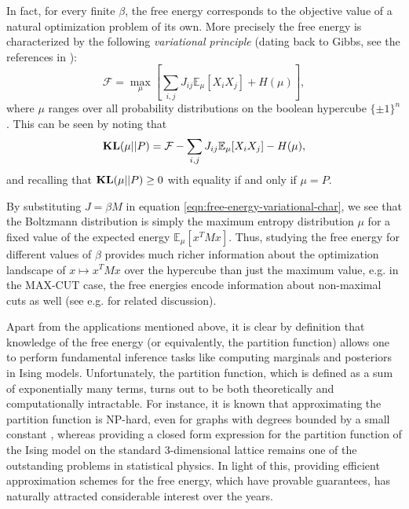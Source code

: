 \documentclass[final, 12pt]{colt2018}
\newcommand{\bE}{\mathbb{E}}
\newcommand{\F}{\mathcal{F}}
\newcommand{\E}{\bE}      %
\newcommand{\KL}{\mathop{\bf KL\/}}
\theoremstyle{definition}
\theoremstyle{plain}
\begin{document}
In fact, for every finite $\beta$, the free energy corresponds
to the objective value of a natural optimization problem of its own.
More precisely the free energy is characterized by the following \emph{variational principle} (dating back to Gibbs, see the references in \citet{ellis2007entropy}):
\begin{equation}
\label{eqn:free-energy-variational-char}
\F = \max_{\mu} \left[\sum_{i,j} J_{ij} \E_{\mu}[X_i X_j] + H(\mu)\right],
\end{equation}
where $\mu$ ranges over all probability distributions on the boolean hypercube $\{\pm 1\}^{n}$. This can be seen by noting that 
\begin{equation}
\label{eqn:free-energy-KL}
\KL(\mu ||P)=\F - \sum_{i,j} J_{ij} \E_{\mu}[X_i X_j] - H(\mu),
\end{equation}
and recalling that $\KL(\mu ||P) \geq 0$ with equality if and only if $\mu = P$.
 
By substituting $J = \beta M$ in equation \cref{eqn:free-energy-variational-char}, we  see %
that the Boltzmann distribution is simply the maximum entropy distribution $\mu$ for a fixed value
of the expected energy $\E_{\mu}[x^T M x]$. Thus, studying the free
energy for different values of $\beta$ provides much richer information about
the optimization landscape of $x \mapsto x^T M x$ over the hypercube than just the maximum value, e.g. in the MAX-CUT case, the free energies encode
information about non-maximal cuts as well (see e.g. \citet{borgs2012convergent} for related discussion).


Apart from the applications mentioned above, it is clear by definition that knowledge of the free energy (or equivalently, the partition function) allows one to perform fundamental inference tasks like computing marginals and posteriors in Ising models. Unfortunately, the partition function, which is defined as a sum of exponentially many terms, turns out to be both theoretically and computationally intractable. For instance, it is known that approximating the partition function is NP-hard, even for graphs with degrees bounded by a small constant \citep{sly-sun}, whereas providing a closed form expression for the partition function of the Ising model on the standard $3$-dimensional lattice remains one of the outstanding problems in statistical physics. In light of this, providing efficient approximation schemes for the free energy, which have provable guarantees, has naturally attracted considerable interest over the years. 
\end{document}
